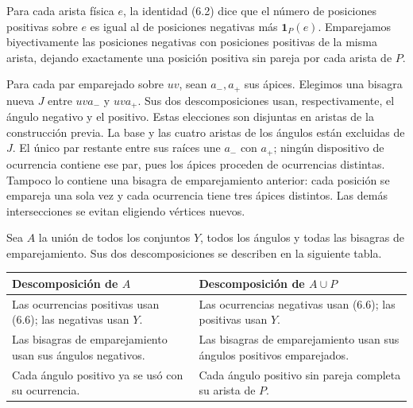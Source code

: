 \documentclass[spanish,11pt,a4paper]{article}
\begin{document}
Para cada arista física \(e\), la identidad (6.2) dice que el número de posiciones positivas sobre \(e\) es igual al de posiciones negativas más \(\mathbf1_P(e)\). Emparejamos biyectivamente las posiciones negativas con posiciones positivas de la misma arista, dejando exactamente una posición positiva sin pareja por cada arista de \(P\).

Para cada par emparejado sobre \(uv\), sean \(a_-,a_+\) sus ápices. Elegimos una bisagra nueva \(J\) entre \(uva_-\) y \(uva_+\). Sus dos descomposiciones usan, respectivamente, el ángulo negativo y el positivo. Estas elecciones son disjuntas en aristas de la construcción previa. La base y las cuatro aristas de los ángulos están excluidas de \(J\). El único par restante entre sus raíces une \(a_-\) con \(a_+\); ningún dispositivo de ocurrencia contiene ese par, pues los ápices proceden de ocurrencias distintas. Tampoco lo contiene una bisagra de emparejamiento anterior: cada posición se empareja una sola vez y cada ocurrencia tiene tres ápices distintos. Las demás intersecciones se evitan eligiendo vértices nuevos.

Sea \(A\) la unión de todos los conjuntos \(Y\), todos los ángulos y todas las bisagras de emparejamiento. Sus dos descomposiciones se describen en la siguiente tabla.

{\begin{longtable}[]{@{}
  >{\raggedright\arraybackslash}p{}
  >{\raggedright\arraybackslash}p{}@{}}
\toprule\noalign{}
\begin{minipage}[b]{\linewidth}\raggedright
Descomposición de \(A\)
\end{minipage} & \begin{minipage}[b]{\linewidth}\raggedright
Descomposición de \(A\cup P\)
\end{minipage} \\
\midrule\noalign{}
\endhead
\bottomrule\noalign{}
\endlastfoot
Las ocurrencias positivas usan (6.6); las negativas usan \(Y\). & Las ocurrencias negativas usan (6.6); las positivas usan \(Y\). \\
Las bisagras de emparejamiento usan sus ángulos negativos. & Las bisagras de emparejamiento usan sus ángulos positivos emparejados. \\
Cada ángulo positivo ya se usó con su ocurrencia. & Cada ángulo positivo sin pareja completa su arista de \(P\). \\
\end{longtable}
}
\end{document}
